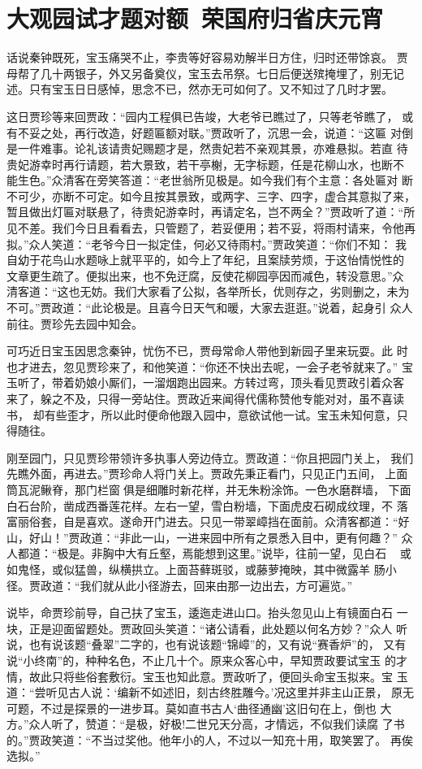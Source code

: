 \chapter{大观园试才题对额~荣国府归省庆元宵}

话说秦钟既死，宝玉痛哭不止，李贵等好容易劝解半日方住，归时还带馀哀。
贾母帮了几十两银子，外又另备奠仪，宝玉去吊祭。七日后便送殡掩埋了，别无记
述。只有宝玉日日感悼，思念不已，然亦无可如何了。又不知过了几时才罢。

这日贾珍等来回贾政：“园内工程俱已告竣，大老爷已瞧过了，只等老爷瞧了，
或有不妥之处，再行改造，好题匾额对联。”贾政听了，沉思一会，说道：“这匾
对倒是一件难事。论礼该请贵妃赐题才是，然贵妃若不亲观其景，亦难悬拟。若直
待贵妃游幸时再行请题，若大景致，若干亭榭，无字标题，任是花柳山水，也断不
能生色。”众清客在旁笑答道：“老世翁所见极是。如今我们有个主意：各处匾对
断不可少，亦断不可定。如今且按其景致，或两字、三字、四字，虚合其意拟了来，
暂且做出灯匾对联悬了，待贵妃游幸时，再请定名，岂不两全？”贾政听了道：“所
见不差。我们今日且看看去，只管题了，若妥便用；若不妥，将雨村请来，令他再
拟。”众人笑道：“老爷今日一拟定佳，何必又待雨村。”贾政笑道：“你们不知：
我自幼于花鸟山水题咏上就平平的，如今上了年纪，且案牍劳烦，于这怡情悦性的
文章更生疏了。便拟出来，也不免迂腐，反使花柳园亭因而减色，转没意思。”众
清客道：“这也无妨。我们大家看了公拟，各举所长，优则存之，劣则删之，未为
不可。”贾政道：“此论极是。且喜今日天气和暖，大家去逛逛。”说着，起身引
众人前往。贾珍先去园中知会。

可巧近日宝玉因思念秦钟，忧伤不已，贾母常命人带他到新园子里来玩耍。此
时也才进去，忽见贾珍来了，和他笑道：“你还不快出去呢，一会子老爷就来了。”
宝玉听了，带着奶娘小厮们，一溜烟跑出园来。方转过弯，顶头看见贾政引着众客
来了，躲之不及，只得一旁站住。贾政近来闻得代儒称赞他专能对对，虽不喜读书，
却有些歪才，所以此时便命他跟入园中，意欲试他一试。宝玉未知何意，只得随往。

刚至园门，只见贾珍带领许多执事人旁边侍立。贾政道：“你且把园门关上，
我们先瞧外面，再进去。”贾珍命人将门关上。贾政先秉正看门，只见正门五间，
上面筒瓦泥鳅脊，那门栏窗俱是细雕时新花样，并无朱粉涂饰。一色水磨群墙，
下面白石台阶，凿成西番莲花样。左右一望，雪白粉墙，下面虎皮石砌成纹理，不
落富丽俗套，自是喜欢。遂命开门进去。只见一带翠嶂挡在面前。众清客都道：“好
山，好山！”贾政道：“非此一山，一进来园中所有之景悉入目中，更有何趣？”
众人都道：“极是。非胸中大有丘壑，焉能想到这里。”说毕，往前一望，见白石
，或如鬼怪，或似猛兽，纵横拱立。上面苔藓斑驳，或藤萝掩映，其中微露羊
肠小径。贾政道：“我们就从此小径游去，回来由那一边出去，方可遍览。”

说毕，命贾珍前导，自己扶了宝玉，逶迤走进山口。抬头忽见山上有镜面白石
一块，正是迎面留题处。贾政回头笑道：“诸公请看，此处题以何名方妙？”众人
听说，也有说该题“叠翠”二字的，也有说该题“锦嶂”的，又有说“赛香炉”的，
又有说“小终南”的，种种名色，不止几十个。原来众客心中，早知贾政要试宝玉
的才情，故此只将些俗套敷衍。宝玉也知此意。贾政听了，便回头命宝玉拟来。宝
玉道：“尝听见古人说：‘编新不如述旧，刻古终胜雕今。’况这里并非主山正景，
原无可题，不过是探景的一进步耳。莫如直书古人‘曲径通幽’这旧句在上，倒也
大方。”众人听了，赞道：“是极，好极!二世兄天分高，才情远，不似我们读腐
了书的。”贾政笑道：“不当过奖他。他年小的人，不过以一知充十用，取笑罢了。
再俟选拟。”

